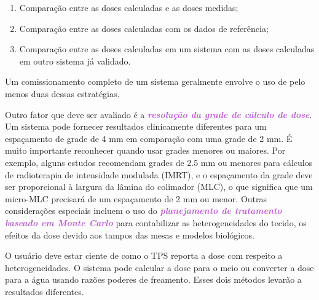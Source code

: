\documentclass[11pt,a4paper]{article}
\newcounter{exemplo}
\begin{document}
	\begin{enumerate}
		\item Comparação entre as doses calculadas e as doses medidas;
		\item Comparação entre as doses calculadas com os dados de referência;
		\item Comparação entre as doses calculadas em um sistema com as doses calculadas em outro sistema já validado.
	\end{enumerate}

	Um comissionamento completo de um sistema geralmente envolve o uso de pelo menos duas dessas estratégias.

	Outro fator que deve ser avaliado é a \textcolor{MediumOrchid}{\textbf{\textit{resolução da grade de cálculo de dose}}}. Um sistema pode fornecer resultados clinicamente diferentes para um espaçamento de grade de 4 mm em comparação com uma grade de 2 mm. É muito importante reconhecer quando usar grades menores ou maiores. Por exemplo, alguns estudos recomendam grades de 2.5 mm ou menores para cálculos de radioterapia de intensidade modulada (IMRT), e o espaçamento da grade deve ser proporcional à largura da lâmina do colimador (MLC), o que significa que um micro-MLC precisará de um espaçamento de 2 mm ou menor. Outras considerações especiais incluem o uso do \textcolor{MediumOrchid}{\textbf{\textit{planejamento de tratamento baseado em Monte Carlo}}} para contabilizar as heterogeneidades do tecido, os efeitos da dose devido aos tampos das mesas e modelos biológicos.

	O usuário deve estar ciente de como o TPS reporta a dose com respeito a heterogeneidades. O sistema pode calcular a dose para o meio ou converter a dose para a água usando razões poderes de freamento. Esses dois métodos levarão a resultados diferentes. 
\end{document}
